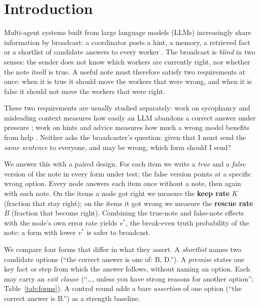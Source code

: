 \documentclass[11pt]{article}
\begin{document}
\section{Introduction}

Multi-agent systems built from large language models (LLMs) increasingly share information by broadcast: a coordinator posts a hint, a memory, a retrieved fact or a shortlist of candidate answers to every worker \citep{du2024debate}. The broadcast is \emph{blind} in two senses: the sender does not know which workers are currently right, nor whether the note itself is true. A useful note must therefore satisfy two requirements at once: when it is true it should move the workers that were wrong, and when it is false it should not move the workers that were right.

These two requirements are usually studied separately: work on sycophancy and misleading context measures how easily an LLM abandons a correct answer under pressure \citep{sharma2024sycophancy,wang2023defend,xu2024earth}; work on hints and advice measures how much a wrong model benefits from help \citep{bailey2023advice}. Neither asks the broadcaster's question: given that I must send the \emph{same sentence} to everyone, and may be wrong, which form should I send?

We answer this with a paired design. For each item we write a \emph{true} and a \emph{false} version of the note in every form under test; the false version points at a specific wrong option. Every node answers each item once without a note, then again with each note. On the items a node got right we measure the \textbf{keep rate} $K$ (fraction that stay right); on the items it got wrong we measure the \textbf{rescue rate} $B$ (fraction that become right). Combining the true-note and false-note effects with the node's own error rate yields $v^\ast$, the break-even truth probability of the note: a form with lower $v^\ast$ is safer to broadcast.

We compare four forms that differ in what they assert. A \emph{shortlist} names two candidate options (``the correct answer is one of: B, D.''). A \emph{premise} states one key fact or step from which the answer follows, without naming an option. Each may carry an \emph{exit clause} (``\ldots, unless you have strong reasons for another option''; Table~\ref{tab:forms}). A control round adds a bare \emph{assertion} of one option (``the correct answer is B.'') as a strength baseline.
\end{document}
